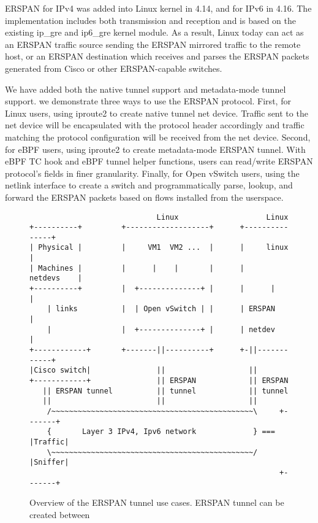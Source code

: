 \documentclass{sigplanconf}
\begin{document}
ERSPAN for IPv4 was added into Linux kernel in 4.14, and for IPv6 in 4.16.
The implementation includes both transmission and reception and is based on the
existing ip\_gre and ip6\_gre kernel module.  As a result, Linux today can act as
an ERSPAN traffic source sending the ERSPAN mirrored traffic to the remote host,
or an ERSPAN destination which receives and parses the ERSPAN packets generated
from Cisco or other ERSPAN-capable switches.
  
We have added both the native tunnel support and metadata-mode tunnel support.
we demonstrate three ways to use the ERSPAN protocol.
First, for Linux users, using iproute2 to create native tunnel net device.
Traffic sent to the net device will be encapsulated with the protocol header
accordingly and traffic matching the protocol configuration will be received
from the net device.  Second, for eBPF users, using iproute2 to create metadata-mode
ERSPAN tunnel.  With eBPF TC hook and eBPF tunnel helper functions, users can
read/write ERSPAN protocol’s fields in finer granularity.
Finally, for Open vSwitch users, using the netlink interface to create a switch
and programmatically parse, lookup, and forward the ERSPAN packets based on flows
installed from the userspace.

\begin{figure}
{\scriptsize
\begin{verbatim}
                             Linux                    Linux
+----------+         +-------------------+      +---------------+
| Physical |         |     VM1  VM2 ...  |      |     linux     |
| Machines |         |      |    |       |      |    netdevs    |
+----------+         |  +--------------+ |      |      |        |
    | links          |  | Open vSwitch | |      | ERSPAN        |
    |                |  +--------------+ |      | netdev        |
+------------+       +-------||----------+      +-||------------+ 
|Cisco switch|               ||                   ||
+------------+               || ERSPAN            || ERSPAN
   || ERSPAN tunnel          || tunnel            || tunnel
   ||                        ||                   ||
    /~~~~~~~~~~~~~~~~~~~~~~~~~~~~~~~~~~~~~~~~~~~~~~\     +-------+ 
    {       Layer 3 IPv4, Ipv6 network             } === |Traffic|
    \~~~~~~~~~~~~~~~~~~~~~~~~~~~~~~~~~~~~~~~~~~~~~~/     |Sniffer|
                                                         +-------+
\end{verbatim}   
}
\vspace{-0.5em}
\caption{Overview of the ERSPAN tunnel use cases. ERSPAN tunnel can be
created between }
\label{overview}
\vspace{-1.0em}
\end{figure}
\end{document}
